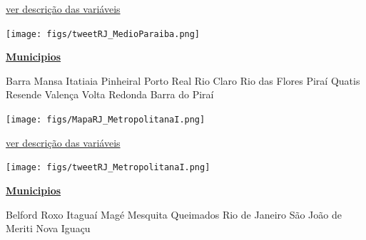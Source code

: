 \documentclass[10pt]{article} %
\begin{document}
\begin{minipage}[t]{.66\linewidth}
\begin{center}

\end{center}
\small{\hyperlink{vartab}{ver descrição das variáveis}}\vspace{0.5cm}\begin{center}
\texttt{[image: figs/tweetRJ\_MedioParaiba.png]}\end{center}
\end{minipage}\hfill\begin{minipage}[t]{.30\linewidth}
\begin{mdframed}[style=sidebar,frametitle={}]
\textbf{\hyperlink{municips}{Municipios}}\begin{itemize}\gsquare Barra Mansa 
\gsquare Itatiaia 
\gsquare Pinheiral 
\gsquare Porto Real 
\gsquare Rio Claro 
\gsquare Rio das Flores 
\gsquare Piraí 
\gsquare Quatis 
\gsquare Resende 
\gsquare Valença 
\gsquare Volta Redonda 
\gsquare Barra do Piraí 
\end{itemize}\BackToContents\end{mdframed}\hfill\end{minipage}\newpage\begin{minipage}[t]{.66\linewidth}
\hypertarget{MtrI}{}
\texttt{[image: figs/MapaRJ\_MetropolitanaI.png]}\vspace{0.5cm}\begin{center}

\end{center}
\small{\hyperlink{vartab}{ver descrição das variáveis}}\vspace{0.5cm}\begin{center}
\texttt{[image: figs/tweetRJ\_MetropolitanaI.png]}\end{center}
\end{minipage}\hfill\begin{minipage}[t]{.30\linewidth}
\begin{mdframed}[style=sidebar,frametitle={}]
\textbf{\hyperlink{municips}{Municipios}}\begin{itemize}\gsquare Belford Roxo 
\gsquare Itaguaí 
\gsquare Magé 
\gsquare Mesquita 
\gsquare Queimados 
\gsquare Rio de Janeiro 
\gsquare São João de Meriti 
\gsquare Nova Iguaçu 

\end{itemize}
\end{mdframed}
\end{minipage}
\end{document}
